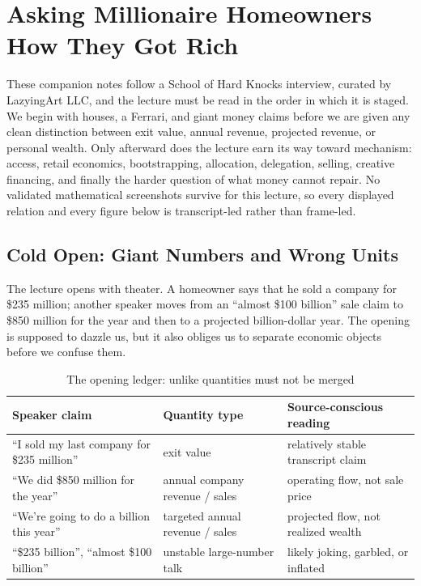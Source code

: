 \chapter{Asking Millionaire Homeowners How They Got Rich}

These companion notes follow a School of Hard Knocks interview, curated by LazyingArt LLC, and the lecture must be read in the order in which it is staged. We begin with houses, a Ferrari, and giant money claims before we are given any clean distinction between exit value, annual revenue, projected revenue, or personal wealth. Only afterward does the lecture earn its way toward mechanism: access, retail economics, bootstrapping, allocation, delegation, selling, creative financing, and finally the harder question of what money cannot repair. No validated mathematical screenshots survive for this lecture, so every displayed relation and every figure below is transcript-led rather than frame-led.

\section{Cold Open: Giant Numbers and Wrong Units}

The lecture opens with theater. A homeowner says that he sold a company for \$235 million; another speaker moves from an ``almost \$100 billion'' sale claim to \$850 million for the year and then to a projected billion-dollar year. The opening is supposed to dazzle us, but it also obliges us to separate economic objects before we confuse them.

\begin{table}[h]
\centering
\caption{The opening ledger: unlike quantities must not be merged}
\begin{tabular}{|l|l|l|}
\hline
Speaker claim & Quantity type & Source-conscious reading \\
\hline
``I sold my last company for \$235 million'' & exit value & relatively stable transcript claim \\
``We did \$850 million for the year'' & annual company revenue / sales & operating flow, not sale price \\
``We're going to do a billion this year'' & targeted annual revenue / sales & projected flow, not realized wealth \\
``\$235 billion'', ``almost \$100 billion'' & unstable large-number talk & likely joking, garbled, or inflated \\
\hline
\end{tabular}
\end{table}

